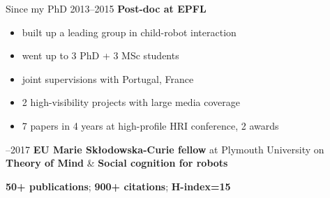 \documentclass[compress]{beamer}
\begin{document}
%
%
%

\begin{frame}{Since my PhD}
    2013--2015  \textbf{Post-doc at EPFL}
    \begin{itemize}
        \item<+-> built up a leading group in child-robot interaction
        \item<+-> went up to 3 PhD + 3 MSc students
        \item<+-> joint supervisions with Portugal, France
        \item<+-> 2 high-visibility projects with large media coverage
        \item<+-> 7 papers in 4 years at high-profile HRI conference, 2 awards
    \end{itemize}

    --2017 \textbf{EU Marie Skłodowska-Curie fellow} at Plymouth University on
    \textbf{Theory of Mind} \& \textbf{Social cognition for robots}


    \vspace{1em}
    \large\centering
    \textbf{50+ publications}; \textbf{900+ citations}; \textbf{H-index=15}

\end{frame}
\end{document}
